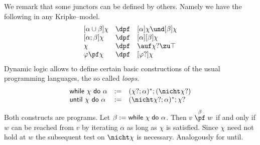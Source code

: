 We remark that some junctors can be defined by others.
Namely we have the following in any Kripke--model.
$$\begin{array}{l@{\quad \dpf \quad}l}
\mbox{} [\alpha \cup \beta]\chi & [\alpha]\chi \und [\beta]\chi \\
\mbox{} [\alpha;\beta]\chi & [\alpha][\beta]\chi \\
\chi & \auf\chi?\zu\top \\
\varphi \pf \chi & [\varphi?]\chi
\end{array}$$
Dynamic logic allows to define certain basic constructions of
the usual programming languages, the so called {\it loops}.
$$\begin{array}{l@{\quad := \quad}l}
\mbox{\sf while } \chi\  \mbox{\sf do } \alpha &
    (\chi?;\alpha)^{\ast};(\nicht\chi?) \\
\mbox{\sf until }\chi\  \mbox{\sf do } \alpha &
    (\nicht\chi?;\alpha)^{\ast};\chi?
\end{array}$$
Both constructs are programs. Let $\beta := \mbox{\sf while }
\chi\;  \mbox{\sf do } \alpha$. Then $v \stackrel{\beta}{\pf} w$
if and only if $w$ can be reached from $v$ by iterating
$\alpha$ as long as $\chi$ is satisfied. Since $\chi$
need not hold at $w$ the subsequent test on $\nicht\chi$
is necessary. Analogously for {\sf until}.

